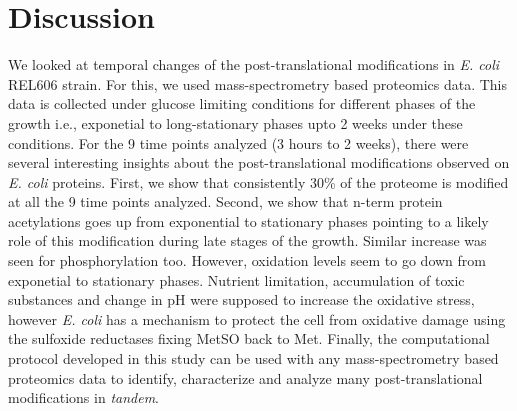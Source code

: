 \documentclass[12pt]{article}
\begin{document}


\section{Discussion}



We looked at temporal changes of the post-translational modifications in \emph{E. coli} REL606 strain. For this, we used mass-spectrometry based proteomics data. This data is collected under glucose limiting conditions for different phases of the growth i.e., exponetial to long-stationary phases upto 2 weeks under these conditions. For the 9 time points analyzed (3 hours to 2 weeks), there were several interesting insights about the post-translational modifications observed on \emph{E. coli} proteins. First, we show that consistently 30\% of the proteome is modified at all the 9 time points analyzed. Second, we show that n-term protein acetylations goes up from exponential to stationary phases pointing to a likely role of this modification during late stages of the growth. Similar increase was seen for phosphorylation too. However, oxidation levels seem to go down from exponetial to stationary phases. Nutrient limitation, accumulation of toxic substances and change in pH were supposed to increase the oxidative stress, however \emph{E. coli} has a mechanism to protect the cell from oxidative damage using the sulfoxide reductases fixing MetSO back to Met. Finally, the computational protocol developed in this study can be used with any mass-spectrometry based proteomics data to identify, characterize and analyze many post-translational modifications in \emph{tandem}.
\end{document}
